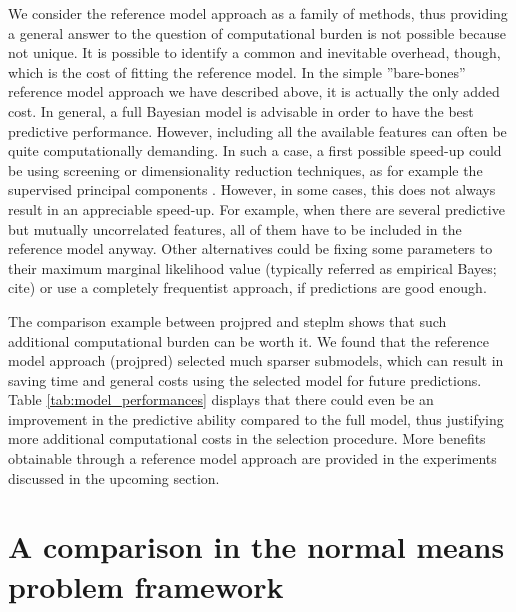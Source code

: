 \documentclass[american,]{article}
\theoremstyle{definition}
\begin{document}
We consider the reference model approach as a family of methods, thus providing a general answer to the question of computational burden is not possible because not unique. It is possible to identify a common and inevitable overhead, though, which is the cost of fitting the reference model. In the simple ''bare-bones'' reference model approach we have described above, it is actually the only added cost. In general, a full Bayesian model is advisable in order to have the best predictive performance. However, including all the available features can often be quite computationally demanding. In such a case, a first possible speed-up could be using screening or dimensionality reduction techniques, as for example the supervised principal components \citep{bair2006prediction,piironen2018}. However, in some cases, this does not always result in an appreciable speed-up. For example, when there are several predictive but mutually uncorrelated features, all of them  have to be included in the reference model anyway. Other alternatives could be fixing some parameters to their maximum marginal likelihood value (typically referred as empirical Bayes; cite) or use a completely frequentist approach, if predictions are good enough.

The comparison example between projpred and steplm shows that such additional computational burden can be worth it. We found that the reference model approach (projpred) selected much sparser submodels, which can result in saving time and general costs using the selected model for future predictions. Table \ref{tab:model_performances} displays that there could even be an improvement in the predictive ability compared to the full model, thus justifying more additional computational costs in the selection procedure. More benefits obtainable through a reference model approach are provided in the experiments discussed in the upcoming section.


\hypertarget{comparison}{%
\section{A comparison in the normal means problem framework}\label{comparison}}
\end{document}
